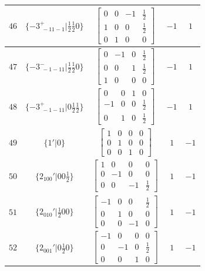 \documentclass[fleqn,8pt]{jsarticle}
\begin{document}
\begin{longtable}{ccccc}
$ 46 $ & $ \{-3^{+}_{\,\,-11-1}|\frac{1}{2} \frac{1}{2} 0\} $ & $ \begin{bmatrix} 0 & 0 & -1 & \frac{1}{2} \\ 1 & 0 & 0 & \frac{1}{2} \\ 0 & 1 & 0 & 0 \end{bmatrix} $ & $ -1 $ & $ 1 $ \\ \hline
$ 47 $ & $ \{-3^{-}_{\,\,-1-11}|\frac{1}{2} \frac{1}{2} 0\} $ & $ \begin{bmatrix} 0 & -1 & 0 & \frac{1}{2} \\ 0 & 0 & 1 & \frac{1}{2} \\ 1 & 0 & 0 & 0 \end{bmatrix} $ & $ -1 $ & $ 1 $ \\ \hline
$ 48 $ & $ \{-3^{+}_{\,\,-1-11}|0 \frac{1}{2} \frac{1}{2}\} $ & $ \begin{bmatrix} 0 & 0 & 1 & 0 \\ -1 & 0 & 0 & \frac{1}{2} \\ 0 & 1 & 0 & \frac{1}{2} \end{bmatrix} $ & $ -1 $ & $ 1 $ \\ \hline
$ 49 $ & $ \{1{}'|0\} $ & $ \begin{bmatrix} 1 & 0 & 0 & 0 \\ 0 & 1 & 0 & 0 \\ 0 & 0 & 1 & 0 \end{bmatrix} $ & $ 1 $ & $ -1 $ \\ \hline
$ 50 $ & $ \{2{}_{100}{}'|0 0 \frac{1}{2}\} $ & $ \begin{bmatrix} 1 & 0 & 0 & 0 \\ 0 & -1 & 0 & 0 \\ 0 & 0 & -1 & \frac{1}{2} \end{bmatrix} $ & $ 1 $ & $ -1 $ \\ \hline
$ 51 $ & $ \{2{}_{010}{}'|\frac{1}{2} 0 0\} $ & $ \begin{bmatrix} -1 & 0 & 0 & \frac{1}{2} \\ 0 & 1 & 0 & 0 \\ 0 & 0 & -1 & 0 \end{bmatrix} $ & $ 1 $ & $ -1 $ \\ \hline
$ 52 $ & $ \{2{}_{001}{}'|0 \frac{1}{2} 0\} $ & $ \begin{bmatrix} -1 & 0 & 0 & 0 \\ 0 & -1 & 0 & \frac{1}{2} \\ 0 & 0 & 1 & 0 \end{bmatrix} $ & $ 1 $ & $ -1 $ \\ \hline

\end{longtable}
\end{document}
